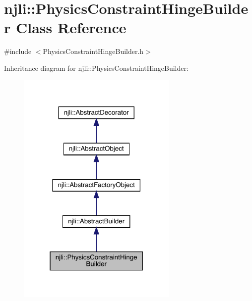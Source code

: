 \hypertarget{classnjli_1_1_physics_constraint_hinge_builder}{}\section{njli\+:\+:Physics\+Constraint\+Hinge\+Builder Class Reference}
\label{classnjli_1_1_physics_constraint_hinge_builder}


{\ttfamily \#include $<$Physics\+Constraint\+Hinge\+Builder.\+h$>$}



Inheritance diagram for njli\+:\+:Physics\+Constraint\+Hinge\+Builder\+:\nopagebreak
\begin{figure}[H]
\begin{center}
\leavevmode
\includegraphics[width=220pt]{classnjli_1_1_physics_constraint_hinge_builder__inherit__graph}
\end{center}
\end{figure}



